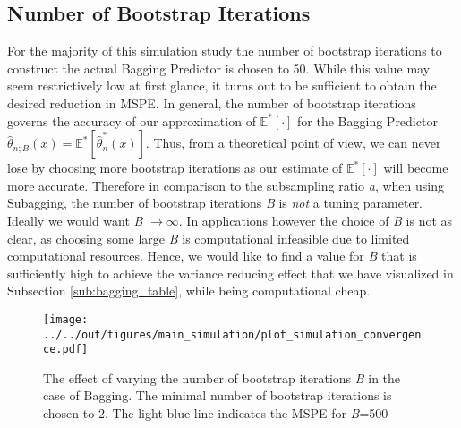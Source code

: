 \subsection{Number of Bootstrap Iterations}\label{sub:boot_i}
For the majority of this simulation study the number of bootstrap iterations to construct the actual Bagging Predictor is chosen to 50. While this value may seem restrictively low at first glance, it turns out to be sufficient to obtain the desired reduction in MSPE. \tabularnewline
In general, the number of bootstrap iterations governs the accuracy of our approximation of $\mathbb{E}^{*}[\cdot]$ for the Bagging Predictor $\hat{\theta}_{n;B}(x)=\mathbb{E}^{*}[\hat{\theta}^{*}_{n}(x)]$. Thus, from a theoretical point of view, we can never lose by choosing more bootstrap iterations as our estimate of $\mathbb{E}^{*}[\cdot]$ will become more accurate. Therefore in comparison to the subsampling ratio \textit{a}, when using Subagging, the number of bootstrap iterations \textit{B} is \textit{not} a tuning parameter. Ideally we would want \textit{B} $\rightarrow \infty $.
\tabularnewline
In applications however the choice of \textit{B} is not as clear, as choosing some large \textit{B} is computational infeasible due to limited computational resources. Hence, we would like to find a value for \textit{B} that is sufficiently high to achieve the variance reducing effect that we have visualized in Subsection \ref{sub:bagging_table}, while being computational cheap.
\begin{figure}[t]
\centering
\texttt{[image: ../../out/figures/main\_simulation/plot\_simulation\_convergence.pdf]}
\caption[The effect of varying the number of bootstrap iterations \textit{B} in the case of Bagging.]{The effect of varying the number of bootstrap iterations \textit{B} in the case of Bagging. The minimal number of bootstrap iterations is chosen to 2. The light blue line indicates the MSPE for \textit{B}=500}
\label{fig:b_iterations}
\end{figure}

